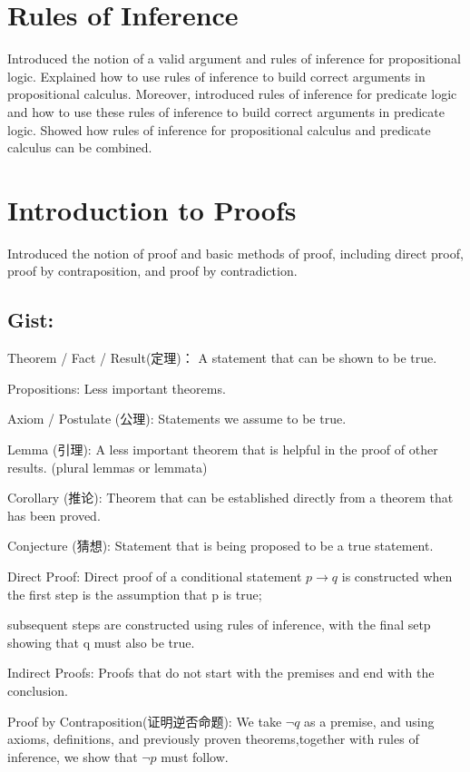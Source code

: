 \documentclass[none,green,normal,cn]{elegantnote}
\begin{document}
\section{Rules of Inference}
Introduced the notion of a valid argument and rules of inference for propositional logic.
Explained how to use rules of inference to build correct arguments in propositional calculus.
Moreover, introduced rules of inference for predicate logic and how to use these rules of inference to build correct arguments in predicate logic.
Showed how rules of inference for propositional  calculus and predicate calculus can be combined.

\section{Introduction to Proofs}
Introduced the notion of proof and basic methods of proof, including direct proof, proof by contraposition, and proof by contradiction.

\subsection{Gist:}
Theorem / Fact / Result(定理)： A statement that can be shown to be true.

Propositions: Less important theorems.

Axiom / Postulate (公理): Statements we assume to be true.

Lemma (引理): A less important theorem that is helpful in the proof of other results. (plural lemmas or lemmata)

Corollary (推论): Theorem that can be established directly from a theorem that has been proved.

Conjecture (猜想): Statement that is being proposed to be a true statement.

Direct Proof: Direct proof of a conditional statement \(p \rightarrow q\) is constructed when the first step is the assumption that p is true;

subsequent steps are constructed using rules of inference, with the final setp showing that q must also be true.

Indirect Proofs: Proofs that do not start with the premises and end with the conclusion.

Proof by Contraposition(证明逆否命题): We take \(\neg q\) as a premise, and using axioms, definitions, and previously proven theorems,together with rules of inference, we show that \(\neg p\) must follow.
\end{document}
